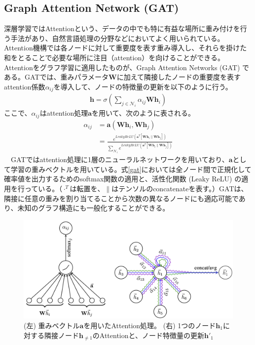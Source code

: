 \subsection{Graph Attention Network (GAT)}
深層学習ではAttentionという、データの中でも特に有益な場所に重み付けを行う手法があり、自然言語処理の分野などにおいてよく用いられている。Attention機構では各ノードに対して重要度を表す重み導入し、それらを掛けた和をとることで必要な場所に注目（attention）を向けることができる。Attentionをグラフ学習に適用したものが、Graph Attention Networks (GAT) \cite{gat} である。GATでは、重みパラメータ$\mathbf{W}$に加えて隣接したノードの重要度を表すattention係数$\alpha_{ij}$を導入して、ノードの特徴量の更新を以下のように行う。
\begin{align}
\mathbf{h} = \sigma (\sum_{j \in \mathcal{N}_i} \alpha_{ij} \mathbf{W} \mathbf{h}_i )
\end{align}
ここで、$\alpha_{ij}$はattention処理$\mathbf{a}$を用いて、次のように表される。
\begin{align}
\alpha_{ij} &= \mathbf{a}(\mathbf{W}\mathbf{h}_i, \mathbf{W}\mathbf{h}_j)\\
 &= \frac{e^{LeakyReLU(\mathbf{a}^T [ \mathbf{W}\mathbf{h}_i \parallel \mathbf{W}\mathbf{h}_j ])}}{\sum_{\mathcal{N}_i} e^{LeakyReLU(\mathbf{a}^T [ \mathbf{W}\mathbf{h}_i \parallel  \mathbf{W}\mathbf{h}_j ])}}
\label{gat}
\end{align}
　GATではattention処理に1層のニューラルネットワークを用いており、$\mathbf{a}$として学習の重みベクトルを用いている。式\ref{gat}においては全ノード間で正規化して確率値を出力するためのsoftmax関数の適用と、活性化関数 (Leaky ReLU) の適用を行っている。（$\cdot^T$は転置を、$\parallel$はテンソルのconcatenateを表す。）GATは、隣接に任意の重みを割り当てることから次数の異なるノードにも適応可能であり、未知のグラフ構造にも一般化することができる。
\begin{figure}[H]
	\begin{center}
 \includegraphics[keepaspectratio, scale=0.25]
 	{Figure/Deeplearning/gat.png}
 		\caption{ (左) 重みベクトル$\mathbf{a}$を用いたAttention処理。 (右) 1つのノード$\mathbf{h}_1$に対する隣接ノード$\mathbf{h}_{\neq 1}$のAttentionと、ノード特徴量の更新$\mathbf{h'}_1$}
	\end{center}
\end{figure}